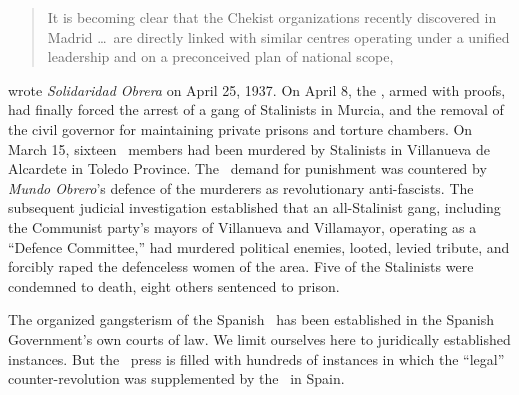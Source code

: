 \begin{quotation}
  It is becoming clear that the Chekist organizations recently discovered in Madrid \dots\ are directly linked with similar centres operating under a unified leadership and on a preconceived plan of national scope,
\end{quotation}
wrote \emph{Solidaridad Obrera} on April 25, 1937. On April 8, the \CNT, armed with proofs, had finally forced the arrest of a gang of Stalinists in Murcia, and the removal of the civil governor for maintaining private prisons and torture chambers. On March 15, sixteen \CNT\ members had been murdered by Stalinists in Villanueva de Alcardete in Toledo Province. The \CNT\ demand for punishment was countered by \emph{Mundo Obrero}’s defence of the murderers as revolutionary anti-fascists. The subsequent judicial investigation established that an all-Stalinist gang, including the Communist party’s mayors of Villanueva and Villamayor, operating as a ``Defence Committee,'' had murdered political enemies, looted, levied tribute, and forcibly raped the defenceless women of the area. Five of the Stalinists were condemned to death, eight others sentenced to prison.

The organized gangsterism of the Spanish \GPU\ has been established in the Spanish Government’s own courts of law. We limit ourselves here to juridically established instances. But the \CNT\ press is filled with hundreds of instances in which the ``legal'' counter-revolution was supplemented by the \GPU\ in Spain.